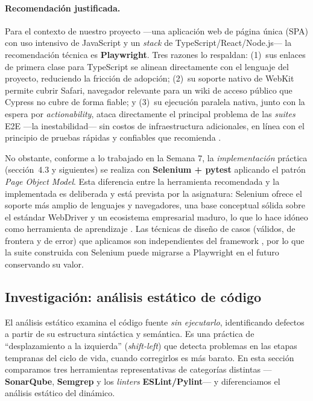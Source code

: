 \documentclass[12pt,a4paper]{article}
\begin{document}
\paragraph{Recomendación justificada.}
Para el contexto de nuestro proyecto ---una aplicación web de página única (SPA) con uso
intensivo de JavaScript y un \textit{stack} de TypeScript/React/Node.js--- la
recomendación técnica es \textbf{Playwright}. Tres razones lo respaldan: (1)~sus enlaces
de primera clase para TypeScript se alinean directamente con el lenguaje del proyecto,
reduciendo la fricción de adopción; (2)~su soporte nativo de WebKit permite cubrir Safari,
navegador relevante para un wiki de acceso público que Cypress no cubre de forma fiable; y
(3)~su ejecución paralela nativa, junto con la espera por \textit{actionability}, ataca
directamente el principal problema de las \textit{suites} E2E ---la inestabilidad--- sin
costos de infraestructura adicionales, en línea con el principio de pruebas rápidas y
confiables que recomienda \citet{aniche2022}.

No obstante, conforme a lo trabajado en la Semana 7, la \emph{implementación} práctica
(sección~4.3 y siguientes) se realiza con \textbf{Selenium + pytest} aplicando el
patrón \textit{Page Object Model}. Esta diferencia entre la herramienta recomendada y la
implementada es deliberada y está prevista por la asignatura: Selenium ofrece el soporte
más amplio de lenguajes y navegadores, una base conceptual sólida sobre el estándar
WebDriver y un ecosistema empresarial maduro, lo que lo hace idóneo como herramienta de
aprendizaje \citep{garcia2022}. Las técnicas de diseño de casos (válidos, de frontera
y de error) que aplicamos son independientes del framework \citep{jorgensen2022}, por
lo que la suite construida con Selenium puede migrarse a Playwright en el futuro
conservando su valor.

\subsection{Investigación: análisis estático de código}
\label{sec:4-2}

El análisis estático examina el código fuente \emph{sin ejecutarlo}, identificando
defectos a partir de su estructura sintáctica y semántica. Es una práctica de
``desplazamiento a la izquierda'' (\textit{shift-left}) que detecta problemas en las
etapas tempranas del ciclo de vida, cuando corregirlos es más barato. En esta sección
comparamos tres herramientas representativas de categorías distintas
---\textbf{SonarQube}, \textbf{Semgrep} y los \textit{linters} \textbf{ESLint/Pylint}---
y diferenciamos el análisis estático del dinámico.
\end{document}
